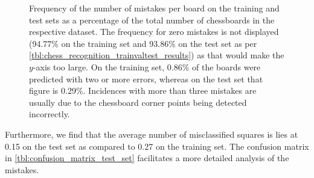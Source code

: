 \documentclass[../main.tex]{subfiles}
\begin{document}
\begin{figure}
{\begin{tikzpicture}
        \end{tikzpicture}
    }
    \caption[Frequency of the number of mistakes per board on the training and test sets.]{Frequency of the number of mistakes per board on the training and test sets as a percentage of the total number of chessboards in the respective dataset. The frequency for zero mistakes is not displayed (94.77\% on the training set and 93.86\% on the test set as per \cref{tbl:chess_recognition_trainvaltest_results}) as that would make the $y$-axis too large. On the training set, 0.86\% of the boards were predicted with two or more errors, whereas on the test set that figure is 0.29\%. Incidences with more than three mistakes are usually due to the chessboard corner points being detected incorrectly.}
    \label{fig:mistakes_frequency}
\end{figure}
Furthermore, we find that the average number of misclassified squares is lies at 0.15 on the test set as compared to 0.27 on the training set.
The confusion matrix in \cref{tbl:confusion_matrix_test_set} facilitates a more detailed analysis of the mistakes.
\end{document}
